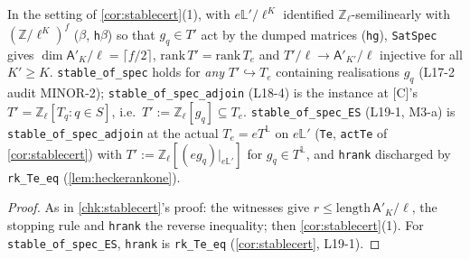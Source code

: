 \begin{theorem}\label{chk:stablecert-sound}
  \leanok
  In the setting of \ref{cor:stablecert}(1), with $e\mathbb L'/\ell^K$ identified $\mathbb Z_\ell$-semilinearly with
  $(\mathbb Z/\ell^K)^f$ ($\beta$, \texttt{h$\beta$}) so that $g_q\in T'$ act by the dumped matrices (\texttt{hg}),
  \texttt{SatSpec} gives $\dim\mathsf A'_K/\ell=\lceil f/2\rceil$, $\mathrm{rank}\,T'=\mathrm{rank}\,T_e$ and
  $T'/\ell\to\mathsf A'_{K'}/\ell$ injective for all $K'\ge K$. \texttt{stable\_of\_spec} holds for \emph{any} $T'\hookrightarrow T_e$
  containing realisations $g_q$ (L17-2 audit MINOR-2); \texttt{stable\_of\_spec\_adjoin} (L18-4) is the instance at [C]'s
  $T'=\mathbb Z_\ell[T_q:q\in S]$, i.e.\ $T':=\mathbb Z_\ell[g_q]\subseteq T_e$. \texttt{stable\_of\_spec\_ES} (L19-1, M3-a) is
  \texttt{stable\_of\_spec\_adjoin} at the actual $T_e=eT^{\mathbb L}$ on $e\mathbb L'$ (\texttt{Te}, \texttt{actTe} of
  \ref{cor:stablecert}) with $T':=\mathbb Z_\ell[(eg_q)|_{e\mathbb L'}]$ for $g_q\in T^{\mathbb L}$, and \texttt{hrank} discharged by
  \texttt{rk\_Te\_eq} (\ref{lem:heckerankone}).
\end{theorem}
\begin{proof}
  \leanok
  As in \ref{chk:stablecert}'s proof: the witnesses give $r\le\mathrm{length}\,\mathsf A'_K/\ell$, the stopping rule and
  \texttt{hrank} the reverse inequality; then \ref{cor:stablecert}(1). For \texttt{stable\_of\_spec\_ES}, \texttt{hrank} is \texttt{rk\_Te\_eq} (\ref{cor:stablecert}, L19-1).
\end{proof}

